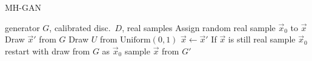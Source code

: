 \begin{algorithm}[tb]
   \caption{MH-GAN}
   \label{alg:mhgan}
\begin{algorithmic}
    generator $G$, calibrated disc.~$D$, real samples
   \STATE Assign random real sample $\vec x_0$ to $\vec x$
   \STATE Draw $\vec x'$ from $G$
   \STATE Draw $U$ from $\textrm{Uniform}(0,1)$
   \STATE $\vec x \leftarrow \vec x'$
   \ENDIF
   \ENDFOR
   \STATE If $\vec x$ is still real sample $\vec x_0$ restart with draw from $G$ as $\vec x_0$
    sample $\vec x$ from $G'$
\end{algorithmic}
\end{algorithm}

